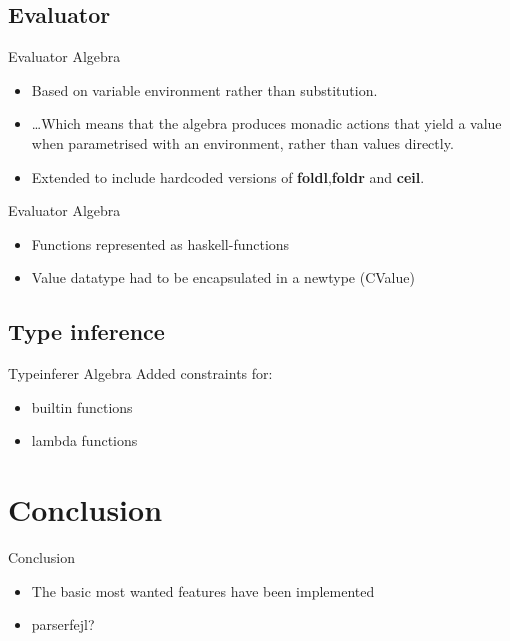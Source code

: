 \documentclass{beamer}
\begin{document}
\subsection*{Evaluator}

\begin{frame}{Evaluator Algebra}
\begin{itemize}
\item Based on variable environment rather than substitution.
\item \dots Which means that the algebra produces monadic actions that yield a
value when parametrised with an environment, rather than values directly.
\item Extended to include hardcoded versions of \textbf{foldl},\textbf{foldr} and \textbf{ceil}.
\end{itemize}
\end{frame}

\begin{frame}{Evaluator Algebra}

\begin{itemize}
  \item Functions represented as haskell-functions
  \item Value datatype had to be encapsulated in a newtype (CValue)
\end{itemize}

\end{frame}

\subsection*{Type inference}

\begin{frame}{Typeinferer Algebra}
Added constraints for:
\begin{itemize}
  \item builtin functions
  \item lambda functions
\end{itemize}

\end{frame}

\section{Conclusion}

\begin{frame}{Conclusion}

\begin{itemize}
  \item The basic most wanted features have been implemented
  \item parserfejl?
\end{itemize}

\end{frame}
\end{document}

